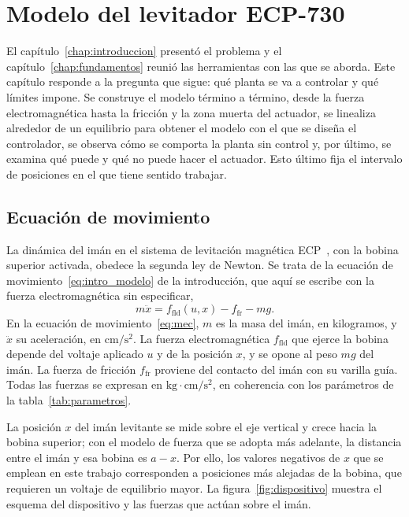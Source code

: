 \chapter{Modelo del levitador ECP-730}\label{chap:modelo}

El capítulo~\ref{chap:introduccion} presentó el problema y el capítulo~\ref{chap:fundamentos} reunió las herramientas con las que se aborda. Este capítulo responde a la pregunta que sigue: qué planta se va a controlar y qué límites impone. Se construye el modelo término a término, desde la fuerza electromagnética hasta la fricción y la zona muerta del actuador, se linealiza alrededor de un equilibrio para obtener el modelo con el que se diseña el controlador, se observa cómo se comporta la planta sin control y, por último, se examina qué puede y qué no puede hacer el actuador. Esto último fija el intervalo de posiciones en el que tiene sentido trabajar.

\section{Ecuación de movimiento}\label{sec:ec_movimiento}

La dinámica del imán en el sistema de levitación magnética ECP~\cite{730}, con la bobina superior activada, obedece la segunda ley de Newton. Se trata de la ecuación de movimiento~\eqref{eq:intro_modelo} de la introducción, que aquí se escribe con la fuerza electromagnética sin especificar,
\begin{equation}
m\ddot{x} = f_{\text{fld}}(u,x) - f_{\text{fr}} - mg .
\label{eq:mec}
\end{equation}
En la ecuación de movimiento~\eqref{eq:mec}, $m$ es la masa del imán, en kilogramos, y $\ddot{x}$ su aceleración, en $\text{cm}/\text{s}^2$. La fuerza electromagnética $f_{\text{fld}}$ que ejerce la bobina depende del voltaje aplicado $u$ y de la posición $x$, y se opone al peso $mg$ del imán. La fuerza de fricción $f_{\text{fr}}$ proviene del contacto del imán con su varilla guía. Todas las fuerzas se expresan en $\text{kg}\cdot\text{cm}/\text{s}^2$, en coherencia con los parámetros de la tabla~\ref{tab:parametros}.

La posición $x$ del imán levitante se mide sobre el eje vertical y crece hacia la bobina superior; con el modelo de fuerza que se adopta más adelante, la distancia entre el imán y esa bobina es $a-x$. Por ello, los valores negativos de $x$ que se emplean en este trabajo corresponden a posiciones más alejadas de la bobina, que requieren un voltaje de equilibrio mayor. La figura~\ref{fig:dispositivo} muestra el esquema del dispositivo y las fuerzas que actúan sobre el imán.

